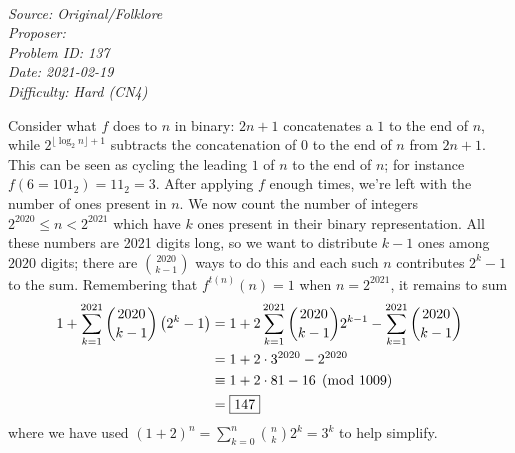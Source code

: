\SSbreak\\
\emph{Source: Original/Folklore}\\
\emph{Proposer: \Paiya}\\ %
\emph{Problem ID: 137}\\
\emph{Date: 2021-02-19}\\
\emph{Difficulty: Hard (CN4)}\\
\SSbreak

\bigskip

\begin{solution}\hfil\medskip
	
    Consider what $f$ does to $n$ in binary: $2n + 1$ concatenates a $1$ to the end of $n$, while 
    $2^{\lfloor \log_2n \rfloor + 1}$ subtracts the concatenation of $0$ to the end of $n$ from $2n + 1$. 
    This can be seen as cycling the leading $1$ of $n$ to the end of $n$; for instance $f\left(6 = 101_2\right) = 11_2 = 3$. 
    After applying $f$ enough times, we're left with the number of ones present in $n$. We now count the number of integers $2^{2020} \leq n < 2^{2021}$
    which have $k$ ones present in their binary representation. All these numbers are 2021 digits long, so we want to distribute $k - 1$ ones among $2020$ digits;
    there are $\binom{2020}{k - 1}$ ways to do this and each such $n$ contributes $2^k - 1$ to the sum. 
    Remembering that $f^{t(n)}(n) = 1$ when $n = 2^{2021}$, it remains to sum 
    \begin{align*}
        1 + \sum_{k = 1}^{2021} \dbinom{2020}{k - 1}\left(2^k - 1\right) &= 1 + 2\sum_{k = 1}^{2021} \dbinom{2020}{k - 1}2^{k - 1} - \sum_{k = 1}^{2021} \dbinom{2020}{k - 1} \\
        &= 1 + 2 \cdot 3^{2020} - 2^{2020} \\
        &\equiv 1 + 2 \cdot 81 - 16 \pmod{1009}\\
        &= \boxed{147}
    \end{align*}
    where we have used $(1 + 2)^n = \sum_{k = 0}^n \binom{n}{k} 2^k = 3^k$ to help simplify.
\end{solution}\bigskip

